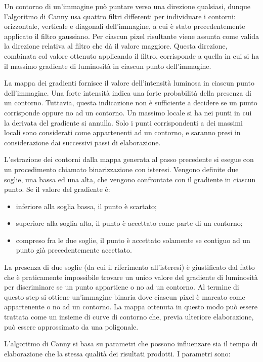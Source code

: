 Un contorno di un'immagine può puntare verso una direzione qualsiasi, dunque l'algoritmo di Canny usa quattro filtri differenti per individuare i contorni: orizzontale, verticale e diagonali dell'immagine, a cui è stato precedentemente applicato il filtro gaussiano. Per ciascun pixel risultante viene assunta come valida la direzione relativa al filtro che dà il valore maggiore. Questa direzione, combinata col valore ottenuto applicando il filtro, corrisponde a quella in cui si ha il massimo gradiente di luminosità in ciascun punto dell'immagine.

La mappa dei gradienti fornisce il valore dell'intensità luminosa in ciascun punto dell'immagine. Una forte intensità indica una forte probabilità della presenza di un contorno. Tuttavia, questa indicazione non è sufficiente a decidere se un punto corrisponde oppure no ad un contorno. Un massimo locale si ha nei punti in cui la derivata del gradiente si annulla. Solo i punti corrispondenti a dei massimi locali sono considerati come appartenenti ad un contorno, e saranno presi in considerazione dai successivi passi di elaborazione. 

L'estrazione dei contorni dalla mappa generata al passo precedente si esegue con un procedimento chiamato binarizzazione con isteresi. Vengono definite due soglie, una bassa ed una alta, che vengono confrontate con il gradiente in ciascun punto. Se il valore del gradiente è:
\begin{itemize}
\item inferiore alla soglia bassa, il punto è scartato;
\item superiore alla soglia alta, il punto è accettato come parte di un contorno;
\item compreso fra le due soglie, il punto è accettato solamente se contiguo ad un punto già precedentemente accettato.
\end{itemize}
La presenza di due soglie (da cui il riferimento all'isteresi) è giustificato dal fatto che è praticamente impossibile trovare un unico valore del gradiente di luminosità per discriminare se un punto appartiene o no ad un contorno. Al termine di questo step si ottiene un'immagine binaria dove ciascun pixel è marcato come appartenente o no ad un contorno. La mappa ottenuta in questo modo può essere trattata come un insieme di curve di contorno che, previa ulteriore elaborazione, può essere approssimato da una poligonale.

L'algoritmo di Canny si basa su parametri che possono influenzare sia il tempo di elaborazione che la stessa qualità dei risultati prodotti. I parametri sono:


